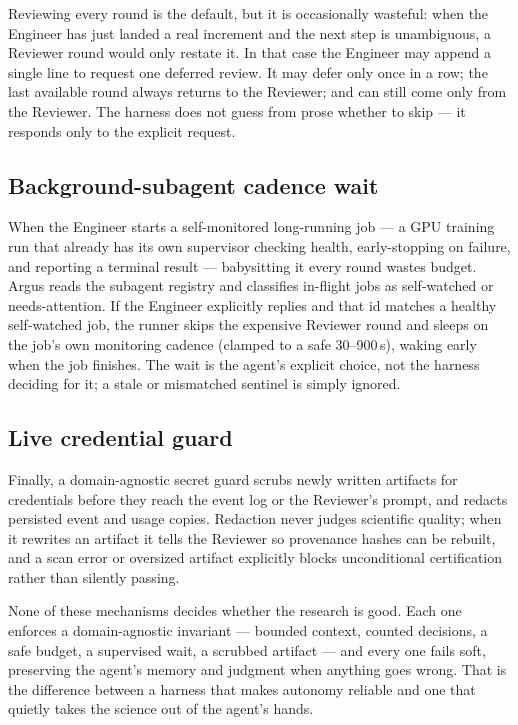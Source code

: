 Reviewing every round is the default, but it is occasionally wasteful: when the
Engineer has just landed a real increment and the next step is unambiguous, a
Reviewer round would only restate it. In that case the Engineer may append a
single  line to request one deferred review. It
may defer only once in a row; the last available round always returns to the
Reviewer; and  can still come only from the Reviewer. The harness does
not guess from prose whether to skip --- it responds only to the explicit request.

\subsection{Background-subagent cadence wait}

When the Engineer starts a self-monitored long-running job --- a GPU training run
that already has its own supervisor checking health, early-stopping on failure,
and reporting a terminal result --- babysitting it every round wastes budget.
Argus reads the subagent registry and classifies in-flight jobs as
self-watched or needs-attention. If the Engineer explicitly replies
 and that id matches a healthy self-watched
job, the runner skips the expensive Reviewer round and sleeps on the job's own
monitoring cadence (clamped to a safe 30--900\,s), waking early when the job
finishes. The wait is the agent's explicit choice, not the harness deciding for
it; a stale or mismatched sentinel is simply ignored.

\subsection{Live credential guard}

Finally, a domain-agnostic secret guard scrubs newly written artifacts for
credentials before they reach the event log or the Reviewer's prompt, and redacts
persisted event and usage copies. Redaction never judges scientific quality; when
it rewrites an artifact it tells the Reviewer so provenance hashes can be rebuilt,
and a scan error or oversized artifact explicitly blocks unconditional
certification rather than silently passing.

\begin{callout}
None of these mechanisms decides whether the research is good. Each one enforces a
domain-agnostic invariant --- bounded context, counted decisions, a safe budget, a
supervised wait, a scrubbed artifact --- and every one fails soft, preserving the
agent's memory and judgment when anything goes wrong. That is the difference
between a harness that makes autonomy reliable and one that quietly takes the
science out of the agent's hands.
\end{callout}
